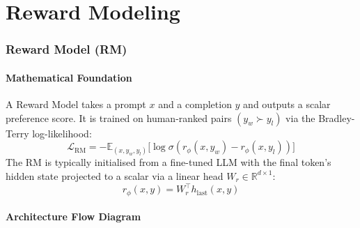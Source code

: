 \documentclass{article}
\begin{document}
\newpage
\part{Reward Modeling}

\section{Reward Model (RM)}

\subsection{Mathematical Foundation}
A Reward Model takes a prompt $x$ and a completion $y$ and outputs a scalar preference score. It is trained on human-ranked pairs $(y_w \succ y_l)$ via the Bradley-Terry log-likelihood:
\begin{equation}
  \mathcal{L}_{\text{RM}} = -\mathbb{E}_{(x,y_w,y_l)}\bigl[\log\sigma(r_\phi(x,y_w) - r_\phi(x,y_l))\bigr]
\end{equation}
The RM is typically initialised from a fine-tuned LLM with the final token's hidden state projected to a scalar via a linear head $W_r \in \mathbb{R}^{d \times 1}$:
\begin{equation}
  r_\phi(x,y) = W_r^\top h_{\text{last}}(x,y)
\end{equation}

\subsection{Architecture Flow Diagram}
\end{document}
